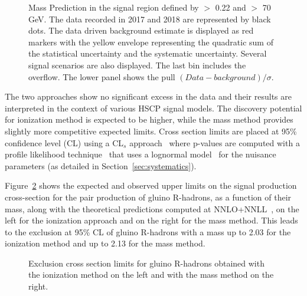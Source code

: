 \begin{figure}[h!]
   \centering
	\caption{Mass Prediction in the signal region defined by  \ias $>$ 0.22 and \pt $>$ 70 GeV.
	The  data recorded in 2017 and 2018 are represented by black dots.
        The data driven background estimate is displayed as red markers with the yellow envelope representing 
	the quadratic sum of the statistical uncertainty and the systematic uncertainty.
	Several signal scenarios are also displayed. The last bin includes the overflow.
	The lower panel shows the pull $(Data - background)/\sigma$.}
	   \label{fig:Results_mass}
\end{figure}



The two approaches show no significant excess in the data and their results are interpreted in the context of various HSCP signal models.  
The discovery potential for ionization method is expected to be higher, while
the mass method provides slightly more competitive expected
limits.
Cross section limits are placed at 95\% confidence level (CL) using a CL$_s$ approach~\cite{Junk:1999kv, READ:JPG2002} where p-values are computed with a profile likelihood technique~\cite{Cowan:2010js} that uses a lognormal model~\cite{Eadie, James} for the nuisance parameters (as detailed in Section~\ref{sec:systematics}). 

Figure~\ref{fig:massLim1} shows the expected and observed upper limits on the signal production cross-section
for the pair production of gluino R-hadrons, as a function of their mass,
along with the theoretical predictions computed at NNLO+NNLL~\cite{Borschensky_2014},
on the left for the ionization approach
and on the right for the mass method. 
This leads to the exclusion at 95\% CL of gluino R-hadrons with a mass up to 2.03 \TeV  for the ionization method and 
up to  2.13 \TeV  for the mass method. 



\begin{figure}[h!]
   \centering
	\caption{Exclusion cross section limits for gluino R-hadrons 
	obtained with the ionization method on the left and with  the mass method on the right.}
   \label{fig:massLim1}
\end{figure}

